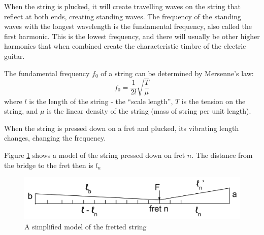 When the string is plucked, it will create travelling waves on the string that reflect at both ends, creating standing waves. The frequency of the standing waves with the longest wavelength is the fundamental frequency, also called the first harmonic. This is the lowest frequency, and there will usually be other higher harmonics that when combined create the characteristic timbre of the electric guitar. \par
The fundamental frequency $f_0$ of a string can be determined by Mersenne's law:
\begin{equation}\label{eqn1}
    f_0 = \frac{1}{2l}\sqrt{\frac{T}{\mu}}
\end{equation}
where $l$ is the length of the string - the “scale length”, $T$ is the tension on the string, and $\mu$ is the linear density of the string (mass of string per unit length). \cite{mersenne} \par
When the string is pressed down on a fret and plucked, its vibrating length changes, changing the frequency.\par
Figure \ref{fig3} shows a model of the string pressed down on fret $n$. The distance from the bridge to the fret then is $l_n$

\begin{figure}[!ht]
    \includegraphics[width=\textwidth]{./ee/fig3.png}
    \caption{A simplified model of the fretted string}\label{fig3}
\end{figure} 

